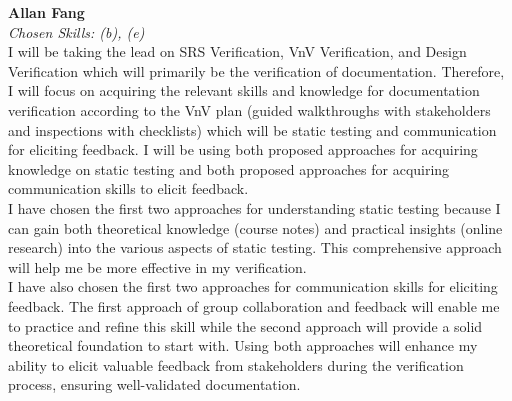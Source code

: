 \documentclass[12pt, titlepage]{article}
\begin{document}
\begin{enumerate}
  \medskip
  \textbf{Allan Fang}\\
  \textit{Chosen Skills: (b), (e) } \\
  I will be taking the lead on SRS Verification, VnV Verification, and Design Verification which will primarily be the verification of documentation. Therefore, I will focus on acquiring the relevant skills and knowledge for documentation verification according to the VnV plan (guided walkthroughs with stakeholders and inspections with checklists) which will be static testing and communication for eliciting feedback. I will be using both proposed approaches for acquiring knowledge on static testing and both proposed approaches for acquiring communication skills to elicit feedback. \\
  I have chosen the first two approaches for understanding static testing because I can gain both theoretical knowledge (course notes) and practical insights (online research) into the various aspects of static testing. This comprehensive approach will help me be more effective in my verification.\\
  I have also chosen the first two approaches for communication skills for eliciting feedback. The first approach of group collaboration and feedback will enable me to practice and refine this skill while the second approach will provide a solid theoretical foundation to start with. Using both approaches will enhance my ability to elicit valuable feedback from stakeholders during the verification process, ensuring well-validated documentation.

  
\end{enumerate}
\end{document}
